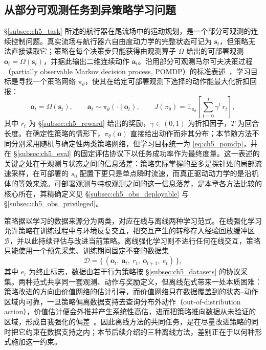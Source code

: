 \subsection{从部分可观测任务到异策略学习问题}\label{subsec:ch5_method_pomdp}

\S\ref{subsec:ch5_task} 所述的航行器在尾流场中的运动规划，是一个部分可观测的连续控制问题。真实流场与航行器六自由度动力学的完整状态可记为 $\mathbf{s}_t$，但策略无法直接读取它；策略在每个决策步只能获得由观测算子 $\Omega$ 给出的可部署观测 $\mathbf{o}_t=\Omega(\mathbf{s}_t)$，并据此输出二维连续动作 $\mathbf{a}_t$。沿用部分可观测马尔可夫决策过程（partially observable Markov decision process, POMDP）的标准表述~\citep{kaelbling1998pomdp}，学习目标是寻找一个策略网络 $\pi_\theta$，使其在给定可部署观测下选择的动作能最大化折扣回报：
\begin{equation}
\mathbf{o}_t = \Omega(\mathbf{s}_t),
\qquad
\mathbf{a}_t \sim \pi_\theta(\cdot \mid \mathbf{o}_t),
\qquad
J(\pi_\theta) = \mathbb{E}_{\pi_\theta}\!\left[\sum_{t=0}^{T}\gamma^{t}\, r_t\right],
\label{eq:ch5_pomdp}
\end{equation}
其中 $r_t$ 为 \S\ref{subsec:ch5_reward} 给出的奖励，$\gamma\in(0,1)$ 为折扣因子，$T$ 为回合长度。在确定性策略的情形下，$\pi_\theta(\mathbf{o})$ 直接给出动作而非其分布；本节随方法不同分别采用随机与确定性两类策略网络，但学习目标统一为 \eqref{eq:ch5_pomdp}，并在 \S\ref{subsec:ch5_eval} 的固定评估协议下以任务成功率作为最终度量。这一表述的关键之处在于观测与状态之间的信息落差：策略实际掌握的至多是探针处的局部流速采样，在可部署的 $s_0$ 配置下更只是单点瞬时流速，而真正驱动动力学的是沿机体的等效来流。可部署观测与特权观测之间的这一信息落差，是本章各方法比较的核心所在，其精确定义见 \S\ref{subsec:ch5_obs_deployable} 与 \S\ref{subsec:ch5_obs_privileged}。

策略据以学习的数据来源分为两类，对应在线与离线两种学习范式。在线强化学习允许策略在训练过程中与环境反复交互，把交互产生的转移存入经验回放缓冲区 $\mathcal{B}$，并以此持续评估与改进当前策略。离线强化学习则不进行任何在线交互，策略只能使用一个预先采集、训练期间固定不变的数据集
\begin{equation}
\mathcal{D} = \big\{\,(\mathbf{o}_t,\ \mathbf{a}_t,\ r_t,\ \mathbf{o}_{t+1},\ e_t)\,\big\},
\label{eq:ch5_offline_data}
\end{equation}
其中 $e_t$ 为终止标志，数据由若干行为策略按 \S\ref{subsec:ch5_datasets} 的协议采集。两种范式共享同一套观测、动作与奖励定义，但离线范式带来一处本质困难：策略改进的方向由价值网络的估计引导，而价值网络只在数据覆盖到的状态–动作区域内可靠，一旦策略偏离数据支持去查询分布外动作（out-of-distribution action），价值估计便会外推并产生系统性高估，进而把策略推向数据从未验证的区域，形成自我强化的偏差~\citep{levine2020offline}。因此离线方法的共同任务，是在尽量改进策略的同时把它约束在数据支持之内；本节后续介绍的三种离线方法，差别正在于以何种形式施加这一约束。

